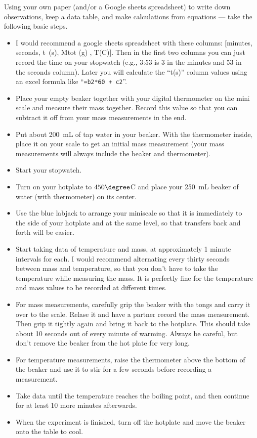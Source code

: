 
\vspace{0.5cm}



 Using your own paper (and/or a Google sheets spreadsheet) to write down observations, keep a data table, and make calculations from equations --- take the following basic steps.
	\begin{itemize}
	\item I would recommend a google sheets spreadsheet with these columns: [minutes, seconds, t~(s), Mtot (g) , T(C)].  Then in the first two columns you can just record the time on your stopwatch (e.g., 3:53 is 3 in the minutes and 53 in the seconds column).  Later you will calculate the ``t(s)'' column values using an excel formula like ``\verb|=b2*60 + c2|''. 
	\item Place your empty beaker together with your digital thermometer on the mini scale and measure their mass together.  Record this value so that you can subtract it off from your mass measurements in the end.
	\item Put about 200~mL of tap water in your beaker.  With the thermometer inside, place it on your scale to get an initial mass measurement (your mass measurements will always include the beaker and thermometer).
	\item Start your stopwatch.
	\item Turn on your hotplate to $450\degree$C and place your 250~mL beaker of water (with thermometer) on its center.
	\item Use the blue labjack to arrange your miniscale so that it is immediately to the side of your hotplate and at the same level, so that transfers back and forth will be easier.
	\item Start taking data of temperature and mass, at approximately 1 minute intervals for each. I would recommend alternating every thirty seconds between mass and temperature, so that you don't have to take the temperature while measuring the mass.  It is perfectly fine for the temperature and mass values to be recorded at different times.
	\item For mass measurements, carefully grip the beaker with the tongs and carry it over to the scale.  Relase it and have a partner record the mass measurement.  Then grip it tightly again and bring it back to the hotplate.  This should take about 10 seconds out of every minute of warming.  Always be careful, but don't remove the beaker from the hot plate for very long.
	\item For temperature measurements, raise the thermometer above the bottom of the beaker and use it to stir for a few seconds before recording a measurement.
	\item Take data until the temperature reaches the boiling point, and then continue for at least 10 more minutes afterwards.
	\item When the experiment is finished, turn off the hotplate and move the beaker onto the table to cool. 
	\end{itemize}
	

